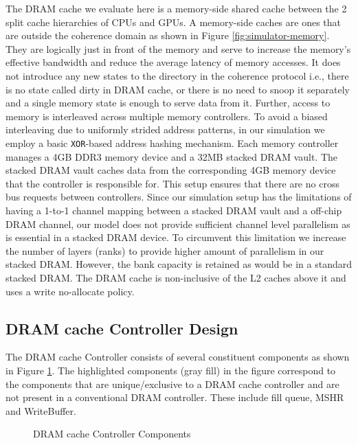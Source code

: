 \par The DRAM cache we evaluate here is a memory-side \cite{skylake,mainak-hpca} shared cache between the 2 split cache hierarchies of CPUs and GPUs. A memory-side caches are ones that are outside the coherence domain as shown in Figure \ref{fig:simulator-memory}. They are logically just in front of the memory and serve to increase the memory's effective bandwidth and reduce the average latency of memory accesses. It does not introduce any new states to the directory in the coherence protocol i.e., there is no state called dirty in DRAM cache, or there is no need to snoop it separately and a single memory state is enough to serve data from it. Further, access to memory is interleaved across multiple memory controllers. To avoid a biased interleaving due to uniformly strided address patterns, in our simulation we employ a basic {\tt XOR}-based address hashing mechanism. Each memory controller manages a 4GB DDR3 memory device and a 32MB stacked DRAM vault. The stacked DRAM vault caches data from the corresponding 4GB memory device that the controller is responsible for. This setup ensures that there are no cross bus requests between controllers. Since our simulation setup has the limitations of having a 1-to-1 channel mapping between a stacked DRAM vault and a off-chip DRAM channel, our model does not provide sufficient channel level parallelism as is essential in a stacked DRAM device. To circumvent this limitation we increase the number of layers (ranks) to provide higher amount of parallelism in our stacked DRAM. However, the bank capacity is retained as would be in a standard stacked DRAM. The DRAM cache is non-inclusive  \cite{coherence-dramcache} of the L2 caches above it and uses a write no-allocate policy. 

\subsection{DRAM cache Controller Design}
The DRAM cache Controller consists of several constituent components as shown in Figure \ref{fig:dramcache-ctrl}. The highlighted components (gray fill) in the figure correspond to the components that are unique/exclusive to a DRAM cache controller and are not present in a conventional DRAM controller. These include fill queue, MSHR and WriteBuffer.

\begin{figure}[!htb]
	\centering
	\def\svgwidth{\columnwidth}
	
	\caption{DRAM cache Controller Components}
	\label{fig:dramcache-ctrl}
\end{figure}

